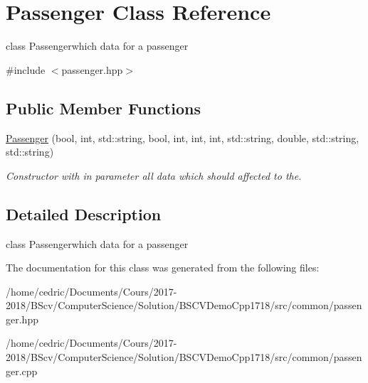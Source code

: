 \hypertarget{class_passenger}{}\section{Passenger Class Reference}
\label{class_passenger}


class Passengerwhich data for a passenger  




{\ttfamily \#include $<$passenger.\+hpp$>$}

\subsection*{Public Member Functions}
\begin{DoxyCompactItemize}
\item 
\mbox{\label{class_passenger_abb998c593a94e49f0ebd614ba8c4bd06}} 
\hyperlink{class_passenger_abb998c593a94e49f0ebd614ba8c4bd06}{Passenger} (bool, int, std\+::string, bool, int, int, int, std\+::string, double, std\+::string, std\+::string)
\begin{DoxyCompactList}\small\item\em Constructor with in parameter all data which should affected to the. \end{DoxyCompactList}\end{DoxyCompactItemize}


\subsection{Detailed Description}
class Passengerwhich data for a passenger 

The documentation for this class was generated from the following files\+:\begin{DoxyCompactItemize}
\item 
/home/cedric/\+Documents/\+Cours/2017-\/2018/\+B\+Scv/\+Computer\+Science/\+Solution/\+B\+S\+C\+V\+Demo\+Cpp1718/src/common/passenger.\+hpp\item 
/home/cedric/\+Documents/\+Cours/2017-\/2018/\+B\+Scv/\+Computer\+Science/\+Solution/\+B\+S\+C\+V\+Demo\+Cpp1718/src/common/passenger.\+cpp\end{DoxyCompactItemize}
